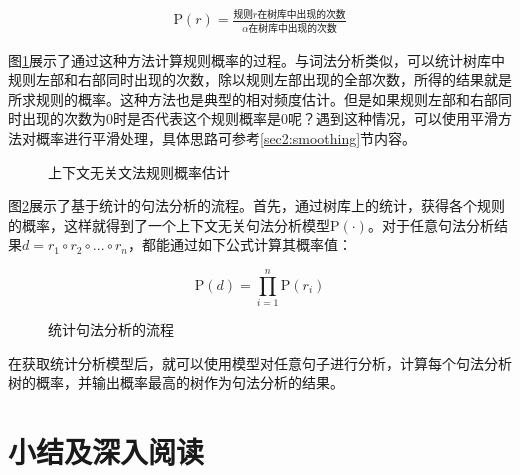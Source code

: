\begin{eqnarray}
\textrm{P}(r)  = \frac{\text{规则$r$在树库中出现的次数}}{\alpha \text{在树库中出现的次数}}
\label{eq:2-49}
\end{eqnarray}

\parinterval 图\ref{fig:2-26}展示了通过这种方法计算规则概率的过程。与词法分析类似，可以统计树库中规则左部和右部同时出现的次数，除以规则左部出现的全部次数，所得的结果就是所求规则的概率。这种方法也是典型的相对频度估计。但是如果规则左部和右部同时出现的次数为0时是否代表这个规则概率是0呢？遇到这种情况，可以使用平滑方法对概率进行平滑处理，具体思路可参考\ref{sec2:smoothing}节内容。

\begin{figure}[htp]
    \centering

	\caption{上下文无关文法规则概率估计}
    \label{fig:2-26}
\end{figure}

\parinterval 图\ref{fig:2-27}展示了基于统计的句法分析的流程。首先，通过树库上的统计，获得各个规则的概率，这样就得到了一个上下文无关句法分析模型$\textrm{P}( \cdot )$。对于任意句法分析结果$d=r_1 \circ r_2 \circ ... \circ r_n$，都能通过如下公式计算其概率值：

\begin{equation}
\textrm{P}(d)= \prod_{i=1}^{n}\textrm{P}(r_i)
\end{equation}

\begin{figure}[htp]
    \centering

	\caption{统计句法分析的流程}
    \label{fig:2-27}
\end{figure}

\parinterval 在获取统计分析模型后，就可以使用模型对任意句子进行分析，计算每个句法分析树的概率，并输出概率最高的树作为句法分析的结果。


\sectionnewpage
\section{小结及深入阅读} \label{sec2:summary}

